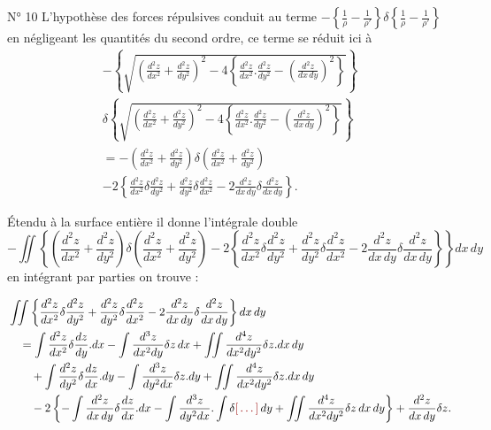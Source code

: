\documentclass[11pt,a4paper]{article}
\begin{document}
N° 10 L'hypothèse des forces répulsives conduit au terme
$-\left\{ \frac{1}{\rho} - \frac{1}{\rho'} \right\}
 \delta\left\{ \frac{1}{\rho} - \frac{1}{\rho'} \right\}$
en négligeant les quantités du second ordre, ce terme se réduit ici à
\begin{gather*}
  -\left\{ \sqrt{ \left( \frac{d^{2}z}{dx^{2}} + \frac{d^{2}z}{dy^{2}} \right)^{2}
     - 4\left\{ \frac{d^{2}z}{dx^{2}} . \frac{d^{2}z}{dy^{2}}
     - \left( \frac{d^{2}z}{dx\,dy} \right)^{2} \right\} } \right\} \\
  \delta\left\{ \sqrt{ \left( \frac{d^{2}z}{dx^{2}} + \frac{d^{2}z}{dy^{2}} \right)^{2}
     - 4\left\{ \frac{d^{2}z}{dx^{2}} . \frac{d^{2}z}{dy^{2}}
     - \left( \frac{d^{2}z}{dx\,dy} \right)^{2} \right\} } \right\} \\
  = -\left( \frac{d^{2}z}{dx^{2}} + \frac{d^{2}z}{dy^{2}} \right)
     \delta\left( \frac{d^{2}z}{dx^{2}} + \frac{d^{2}z}{dy^{2}} \right) \\
   - 2\left\{ \frac{d^{2}z}{dx^{2}} \delta\frac{d^{2}z}{dy^{2}}
     + \frac{d^{2}z}{dy^{2}} \delta\frac{d^{2}z}{dx^{2}}
     - 2\frac{d^{2}z}{dx\,dy} \delta\frac{d^{2}z}{dx\,dy} \right\} .
\end{gather*}

Étendu à la surface entière il donne l'intégrale double
\[
  -\iint \left\{ \left( \frac{d^{2}z}{dx^{2}} + \frac{d^{2}z}{dy^{2}} \right)
     \delta\left( \frac{d^{2}z}{dx^{2}} + \frac{d^{2}z}{dy^{2}} \right)
   - 2\left\{ \frac{d^{2}z}{dx^{2}} \delta\frac{d^{2}z}{dy^{2}}
     + \frac{d^{2}z}{dy^{2}} \delta\frac{d^{2}z}{dx^{2}}
     - 2\frac{d^{2}z}{dx\,dy} \delta\frac{d^{2}z}{dx\,dy} \right\} \right\}
   dx\, dy
\]
en intégrant par parties on trouve :

\begin{align*}
  &\iint \left\{ \frac{d^{2}z}{dx^{2}} \delta\frac{d^{2}z}{dy^{2}}
    + \frac{d^{2}z}{dy^{2}} \delta\frac{d^{2}z}{dx^{2}}
    - 2\frac{d^{2}z}{dx\,dy} \delta\frac{d^{2}z}{dx\,dy} \right\} dx\, dy \\
  &\quad = \int \frac{d^{2}z}{dx^{2}} \delta\frac{dz}{dy} . dx
   - \int \frac{d^{3}z}{dx^{2}dy} \delta z\, dx
   + \iint \frac{d^{4}z}{dx^{2}dy^{2}} \delta z . dx\, dy \\
  &\qquad + \int \frac{d^{2}z}{dy^{2}} \delta\frac{dz}{dx} . dy
   - \int \frac{d^{3}z}{dy^{2}dx} \delta z . dy
   + \iint \frac{d^{4}z}{dx^{2}dy^{2}} \delta z . dx\, dy \\
  &\qquad - 2\left\{ -\int \frac{d^{2}z}{dx\,dy} \delta\frac{dz}{dx} . dx
   - \int \frac{d^{3}z}{dy^{2}dx} . \int \delta\ill{}\, dy
   + \iint \frac{d^{4}z}{dx^{2}dy^{2}} \delta z\, dx\, dy \right\}
   + \frac{d^{2}z}{dx\,dy} \delta z .
\end{align*}
\end{document}
